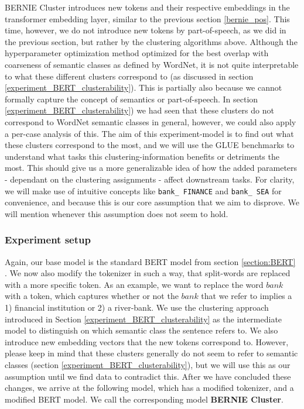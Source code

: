 \documentclass[a4paper,12pt,oneside,openright]{report}
\begin{document}
BERNIE Cluster introduces new tokens and their respective embeddings in the transformer embedding layer, similar to the previous section \ref{bernie_pos}.
This time, however, we do not introduce new tokens by part-of-speech, as we did in the previous section, but rather by the clustering algorithms above.
Although the hyperparameter optimization method optimized for the best overlap with coarseness of semantic classes as defined by WordNet, it is not quite interpretable to what these different clusters correspond to (as discussed in section  \ref{experiment_BERT_clusterability}).
This is partially also because we cannot formally capture the concept of semantics or part-of-speech.
In section \ref{experiment_BERT_clusterability}) we had seen that these clusters do not correspond to WordNet semantic classes in general, however, we could also apply a per-case analysis of this.
The aim of this experiment-model is to find out what these clusters correspond to the most, and we will use the GLUE benchmarks to understand what tasks this clustering-information benefits or detriments the most.
This should give us a more generalizable idea of how the added parameters - dependant on the clustering assignments - affect downstream tasks.
For clarity, we will make use of intuitive concepts like \texttt{bank\_ FINANCE} and \texttt{bank\_ SEA} for convenience, and because this is our core assumption that we aim to disprove.
We will mention whenever this assumption does not seem to hold.

\subsubsection{Experiment setup}

Again, our base model is the standard BERT model from section \ref{section:BERT} .
We now also modify the tokenizer in such a way, that split-words are replaced with a more specific token.
As an example, we want to replace the word $bank$ with a token, which captures whether or not the $bank$ that we refer to implies a 1) financial institution or 2) a river-bank.
We use the clustering approach introduced in Section \ref{experiment_BERT_clusterability} as the intermediate model to distinguish on which semantic class the sentence refers to.
We also introduce new embedding vectors that the new tokens correspond to.
However, please keep in mind that these clusters generally do not seem to refer to semantic classes (section \ref{experiment_BERT_clusterability}), but we will use this as our assumption until we find data to contradict this.
After we have concluded these changes, we arrive at the following model, which has a modified tokenizer, and a modified BERT model.
We call the corresponding model \textbf{BERNIE Cluster}.
\end{document}
